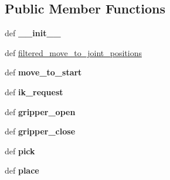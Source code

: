 \subsection*{Public Member Functions}
\begin{DoxyCompactItemize}
\item 
\hypertarget{classik__pick__and__place_1_1_pick_and_place_a9109228a02e5bb3237ca8681816af6f0}{def {\bfseries \-\_\-\-\_\-init\-\_\-\-\_\-}}\label{classik__pick__and__place_1_1_pick_and_place_a9109228a02e5bb3237ca8681816af6f0}

\item 
def \hyperlink{classik__pick__and__place_1_1_pick_and_place_a46ca5a9f86411d7dff8ad3480bb73e93}{filtered\-\_\-move\-\_\-to\-\_\-joint\-\_\-positions}
\item 
\hypertarget{classik__pick__and__place_1_1_pick_and_place_a17e7bc11e80f7e6c907580756193c805}{def {\bfseries move\-\_\-to\-\_\-start}}\label{classik__pick__and__place_1_1_pick_and_place_a17e7bc11e80f7e6c907580756193c805}

\item 
\hypertarget{classik__pick__and__place_1_1_pick_and_place_add82d322431b6674fab28e43dea9f140}{def {\bfseries ik\-\_\-request}}\label{classik__pick__and__place_1_1_pick_and_place_add82d322431b6674fab28e43dea9f140}

\item 
\hypertarget{classik__pick__and__place_1_1_pick_and_place_a15de50807206b52f25584584dabb6dc8}{def {\bfseries gripper\-\_\-open}}\label{classik__pick__and__place_1_1_pick_and_place_a15de50807206b52f25584584dabb6dc8}

\item 
\hypertarget{classik__pick__and__place_1_1_pick_and_place_a532415e7a1fe596f503bf5cba92130b7}{def {\bfseries gripper\-\_\-close}}\label{classik__pick__and__place_1_1_pick_and_place_a532415e7a1fe596f503bf5cba92130b7}

\item 
\hypertarget{classik__pick__and__place_1_1_pick_and_place_af70485ad9591cfc98e7ec52be1f026c8}{def {\bfseries pick}}\label{classik__pick__and__place_1_1_pick_and_place_af70485ad9591cfc98e7ec52be1f026c8}

\item 
\hypertarget{classik__pick__and__place_1_1_pick_and_place_a3ea7fa733a070067e01d72dfdde6c21a}{def {\bfseries place}}\label{classik__pick__and__place_1_1_pick_and_place_a3ea7fa733a070067e01d72dfdde6c21a}

\end{DoxyCompactItemize}


